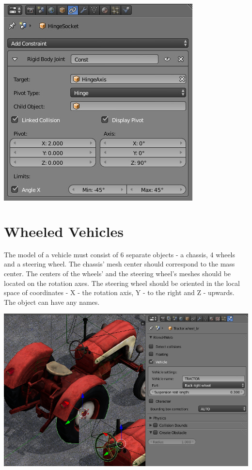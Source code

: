 \documentclass[a4paper,12pt,oneside]{sphinxmanual}
\begin{document}
\includegraphics[width=1.000\linewidth]{physics_constraints_panel.jpg}

\begin{DUlineblock}{0em}
\item[] 
\end{DUlineblock}


\section{Wheeled Vehicles}
\label{physics:id5}
The model of a vehicle must consist of 6 separate objects - a chassis, 4 wheels and a steering wheel. The chassis' mesh center should correspond to the mass center. The centers of the wheels' and the steering wheel's meshes should be located on the rotation axes. The steering wheel should be oriented in the local space of coordinates - X - the rotation axis, Y - to the right and Z - upwards. The object can have any names.

\includegraphics[width=1.000\linewidth]{physics_vehicle_wheeled.jpg}
\end{document}
